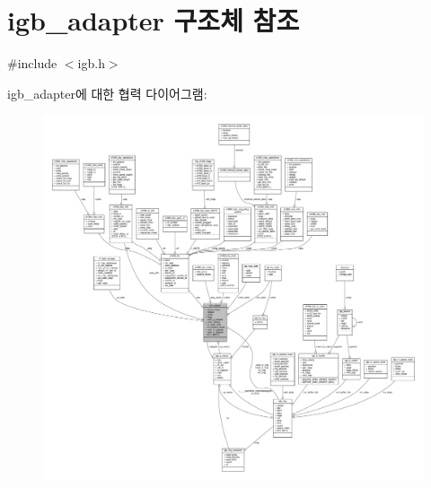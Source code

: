 \hypertarget{structigb__adapter}{}\section{igb\+\_\+adapter 구조체 참조}
\label{structigb__adapter}


{\ttfamily \#include $<$igb.\+h$>$}



igb\+\_\+adapter에 대한 협력 다이어그램\+:
\nopagebreak
\begin{figure}[H]
\begin{center}
\leavevmode
\includegraphics[width=350pt]{structigb__adapter__coll__graph}
\end{center}
\end{figure}
